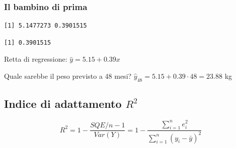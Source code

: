 \documentclass[
  a4paper,
  DIV=11,
  numbers=noendperiod]{scrreprt}
\newenvironment{Shaded}{\begin{snugshade}}{\end{snugshade}}
\newcommand{\FunctionTok}[1]{\textcolor[rgb]{0.13,0.29,0.53}{\textbf{#1}}}
\newcommand{\NormalTok}[1]{#1}
\newcommand{\OtherTok}[1]{\textcolor[rgb]{0.56,0.35,0.01}{#1}}
\newcommand{\SpecialCharTok}[1]{\textcolor[rgb]{0.81,0.36,0.00}{\textbf{#1}}}
\begin{document}
\subsubsection{Il bambino di prima}\label{il-bambino-di-prima-1}

\begin{Shaded}
\end{Shaded}

\begin{verbatim}
[1] 5.1477273 0.3901515
\end{verbatim}

\begin{Shaded}
\end{Shaded}

\begin{verbatim}
[1] 0.3901515
\end{verbatim}

Retta di regressione: \(\hat{y} = 5.15 + 0.39x\)

Quale sarebbe il peso previsto a 48 mesi?
\(\hat{y}_{48} = 5.15 + 0.39 \cdot 48 = 23.88\) kg

\subsection{\texorpdfstring{Indice di adattamento
\(R^2\)}{Indice di adattamento R\^{}2}}\label{indice-di-adattamento-r2}

\[R^2 = 1 - \dfrac{SQE/n-1}{Var(Y)} = 1 - \dfrac{\sum_{i=1}^n e_i^2}{\sum_{i=1}^n (y_i - \bar{y})^2}\]
\end{document}
